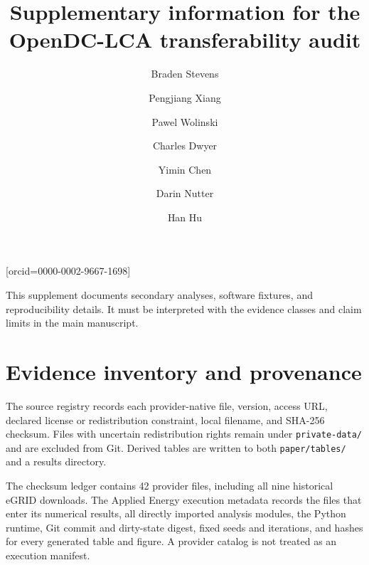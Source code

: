 \documentclass[review,a4paper,fleqn]{cas-sc}
\begin{document}
\title[mode=title]{Supplementary information for the OpenDC-LCA transferability audit}
\author[uark,hfa]{Braden Stevens}
\author[uark,hfa]{Pengjiang Xiang}
\author[ahpcc]{Pawel Wolinski}
\author[its]{Charles Dwyer}
\author[ornl]{Yimin Chen}
\author[uark]{Darin Nutter}
\author[uark]{Han Hu}[orcid=0000-0002-9667-1698]
\maketitle

This supplement documents secondary analyses, software fixtures, and reproducibility details. It must be interpreted with the evidence classes and claim limits in the main manuscript.

\section{Evidence inventory and provenance}
The source registry records each provider-native file, version, access URL, declared license or redistribution constraint, local filename, and SHA-256 checksum. Files with uncertain redistribution rights remain under \texttt{private-data/} and are excluded from Git. Derived tables are written to both \texttt{paper/tables/} and a results directory.

The checksum ledger contains 42 provider files, including all nine historical eGRID downloads. The Applied Energy execution metadata records the files that enter its numerical results, all directly imported analysis modules, the Python runtime, Git commit and dirty-state digest, fixed seeds and iterations, and hashes for every generated table and figure. A provider catalog is not treated as an execution manifest.
\end{document}
